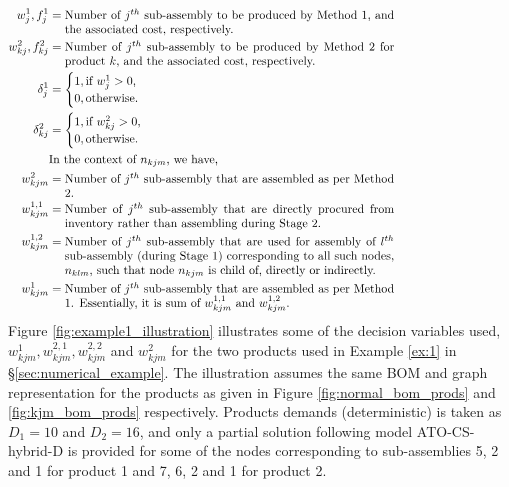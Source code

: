 \documentclass[twoside,onecolumn,12pt,letterpaper]{article}
\begin{document}
\begin{align*}
w_{j}^{1}, f_{j}^{1} & = \parbox[t]{0.8\textwidth}{Number of $j^{th}$  sub-assembly to be produced by Method 1, and the associated cost, respectively.} \\
w_{kj}^{2}, f_{kj}^{2} & = \parbox[t]{0.8\textwidth}{Number of $j^{th}$ sub-assembly to be produced by Method 2 for product $k$, and the associated cost, respectively.} \\
\delta_{j}^{1} &=
\begin{cases}
1, \parbox[t]{\textwidth}{if $w_{j}^{1}>0$,}\\
0, \parbox[t]{\textwidth}{otherwise.}
\end{cases} \\
\delta_{kj}^{2} &=
\begin{cases}
1, \parbox[t]{\textwidth}{if $w_{kj}^{2}>0$,}\\
0, \parbox[t]{0\textwidth}{otherwise.}
\end{cases} \\
& \parbox[t]{\textwidth}{In the context of $n_{kjm}$, we have,} \\
w_{kjm}^{2} &= \parbox[t]{0.8\textwidth}{Number of $j^{th}$ sub-assembly that are assembled as per Method 2.} \\
w_{kjm}^{1,1} &= \parbox[t]{0.8\textwidth}{Number of $j^{th}$ sub-assembly that are directly procured from inventory rather than assembling during Stage 2.} \\
w_{kjm}^{1,2} &= \parbox[t]{0.8\textwidth}{Number of $j^{th}$ sub-assembly that are used for assembly of $l^{th}$ sub-assembly (during Stage 1) corresponding to all such nodes, $n_{klm}$, such that node $n_{kjm}$ is child of, directly or indirectly.}\\
w_{kjm}^{1} &= \parbox[t]{0.8\textwidth}{Number of $j^{th}$ sub-assembly that are assembled as per Method 1. Essentially, it is sum of $w_{kjm}^{1,1}$ and $w_{kjm}^{1,2}$. }
\end{align*} 
Figure \ref{fig:example1_illustration} illustrates some of the decision variables used, $w_{kjm}^{1},w_{kjm}^{2,1},w_{kjm}^{2,2}$ and $w_{kjm}^{2}$ for the two products used in Example \ref{ex:1} in \S\ref{sec:numerical_example}. The illustration assumes the same BOM and graph representation for the products as given in Figure \ref{fig:normal_bom_prods} and  \ref{fig:kjm_bom_prods} respectively. Products demands (deterministic) is taken as $D_1=10$ and $D_2=16$, and only a partial solution following model ATO-CS-hybrid-D is provided for some of the nodes corresponding to sub-assemblies 5, 2 and 1 for product 1 and 7, 6, 2 and 1 for product  2.
\end{document}
